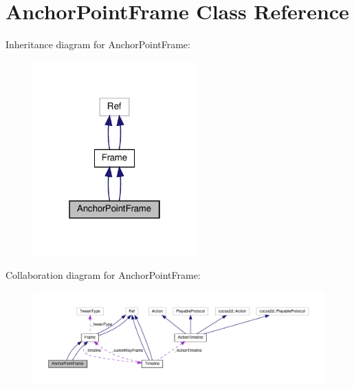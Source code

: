 \hypertarget{classAnchorPointFrame}{}\section{Anchor\+Point\+Frame Class Reference}
\label{classAnchorPointFrame}


Inheritance diagram for Anchor\+Point\+Frame\+:
\nopagebreak
\begin{figure}[H]
\begin{center}
\leavevmode
\includegraphics[width=178pt]{classAnchorPointFrame__inherit__graph}
\end{center}
\end{figure}


Collaboration diagram for Anchor\+Point\+Frame\+:
\nopagebreak
\begin{figure}[H]
\begin{center}
\leavevmode
\includegraphics[width=350pt]{classAnchorPointFrame__coll__graph}
\end{center}
\end{figure}
